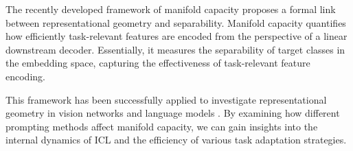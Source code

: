 The recently developed framework of manifold capacity \cite{chung2018classification, wakhloo2023linear, chou2024neural} proposes a formal link between representational geometry and separability. Manifold capacity quantifies how efficiently task-relevant features are encoded from the perspective of a linear downstream decoder. Essentially, it measures the separability of target classes in the embedding space, capturing the effectiveness of task-relevant feature encoding.

This framework has been successfully applied to investigate representational geometry in vision networks \cite{stephenson2019untangling, cohenSeparabilityGeometryObject2020, stephenson2021geometrygeneralizationmemorizationdeep} and language models \cite{mamou2020emergence}. By examining how different prompting methods affect manifold capacity, we can gain insights into the internal dynamics of ICL and the efficiency of various task adaptation strategies.